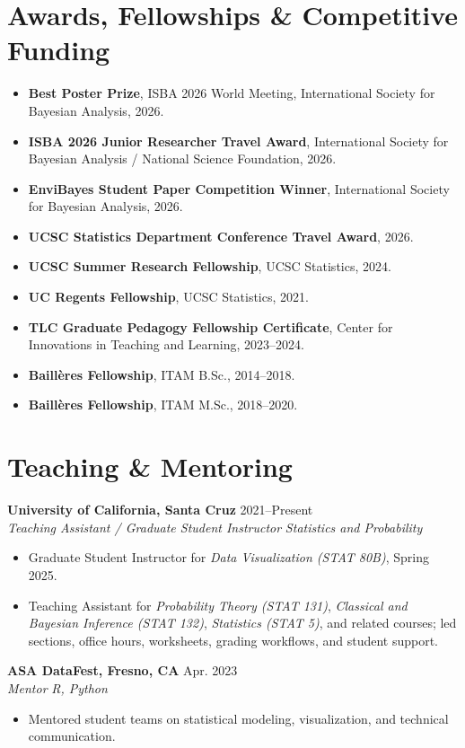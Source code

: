 \documentclass[10pt,letterpaper]{article}
\newcommand{\cvsection}[1]{%
  \Needspace{5\baselineskip}%
  \section*{#1}%
}
\newcommand{\entry}[4]{%
  \Needspace{6\baselineskip}%
  \textbf{#1} \hfill #2\\
  \textit{#3} \hfill \textit{#4}\\[-2pt]
}
\begin{document}
\cvsection{Awards, Fellowships \& Competitive Funding}
\begin{itemize}
  \item \textbf{Best Poster Prize}, ISBA 2026 World Meeting, International Society for Bayesian Analysis, 2026.
  \item \textbf{ISBA 2026 Junior Researcher Travel Award}, International Society for Bayesian Analysis / National Science Foundation, 2026.
  \item \textbf{EnviBayes Student Paper Competition Winner}, International Society for Bayesian Analysis, 2026.
  \item \textbf{UCSC Statistics Department Conference Travel Award}, 2026.
  \item \textbf{UCSC Summer Research Fellowship}, UCSC Statistics, 2024.
  \item \textbf{UC Regents Fellowship}, UCSC Statistics, 2021.
  \item \textbf{TLC Graduate Pedagogy Fellowship Certificate}, Center for Innovations in Teaching and Learning, 2023--2024.
  \item \textbf{Baill\`eres Fellowship}, ITAM B.Sc., 2014--2018.
  \item \textbf{Baill\`eres Fellowship}, ITAM M.Sc., 2018--2020.
\end{itemize}

\cvsection{Teaching \& Mentoring}
\entry{University of California, Santa Cruz}{2021--Present}{Teaching Assistant / Graduate Student Instructor}{Statistics and Probability}
\begin{itemize}
  \item Graduate Student Instructor for \textit{Data Visualization (STAT 80B)}, Spring 2025.
  \item Teaching Assistant for \textit{Probability Theory (STAT 131)}, \textit{Classical and Bayesian Inference (STAT 132)}, \textit{Statistics (STAT 5)}, and related courses; led sections, office hours, worksheets, grading workflows, and student support.
\end{itemize}

\entry{ASA DataFest, Fresno, CA}{Apr. 2023}{Mentor}{R, Python}
\begin{itemize}
  \item Mentored student teams on statistical modeling, visualization, and technical communication.
\end{itemize}
\end{document}
